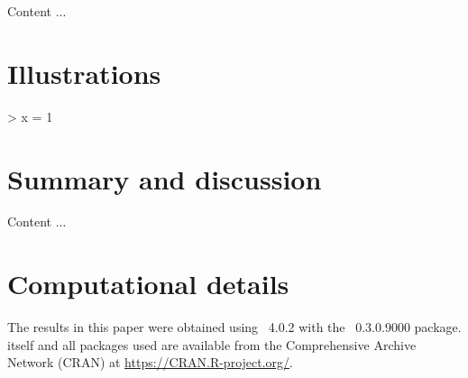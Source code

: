 \documentclass[article]{jss}
\begin{document}
Content ...



\section{Illustrations} \label{sec:illustrations}

%
\begin{Schunk}
\begin{Sinput}
> x = 1 
\end{Sinput}
\end{Schunk}
%



\section{Summary and discussion} \label{sec:summary}

Content ...


\section*{Computational details}

The results in this paper were obtained using
~4.0.2 with the
~0.3.0.9000 package.  itself
and all packages used are available from the Comprehensive
 Archive Network (CRAN) at \url{https://CRAN.R-project.org/}.
\end{document}
